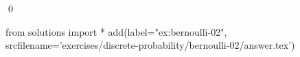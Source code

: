 
\begin{ex} 
  \label{ex:bernoulli-02}
  
  \qed
\end{ex} 
\begin{python0}
from solutions import *
add(label="ex:bernoulli-02",
    srcfilename='exercises/discrete-probability/bernoulli-02/answer.tex') 
\end{python0}
